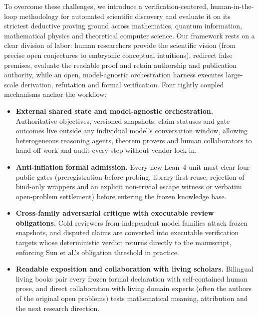 \documentclass[11pt,a4paper]{article}
\begin{document}
To overcome these challenges, we introduce a verification-centered,
human-in-the-loop methodology for automated scientific discovery and evaluate
it on its strictest deductive proving ground across mathematics, quantum
information, mathematical physics and theoretical computer science. Our
framework rests on a clear division of labor: human researchers provide the
scientific vision (from precise open conjectures to embryonic conceptual
intuitions), redirect false premises, evaluate the readable proof and retain
authorship and publication authority, while an open, model-agnostic
orchestration harness executes large-scale derivation, refutation and formal
verification. Four tightly coupled mechanisms anchor the workflow:
\begin{itemize}
\item \textbf{External shared state and model-agnostic orchestration.}
Authoritative objectives, versioned snapshots, claim statuses and gate outcomes
live outside any individual model's conversation window, allowing heterogeneous
reasoning agents, theorem provers and human collaborators to hand off work and
audit every step without vendor lock-in.
\item \textbf{Anti-inflation formal admission.} Every new Lean~4 unit must
clear four public gates (preregistration before probing, library-first reuse,
rejection of bind-only wrappers and an explicit non-trivial escape witness or
verbatim open-problem settlement) before entering the frozen knowledge base.
\item \textbf{Cross-family adversarial critique with executable review
obligations.} Cold reviewers from independent model families attack frozen
snapshots, and disputed claims are converted into executable verification
targets whose deterministic verdict returns directly to the manuscript,
enforcing Sun et al.'s obligation threshold in practice.
\item \textbf{Readable exposition and collaboration with living scholars.}
Bilingual living books pair every frozen formal declaration with self-contained
human prose, and direct collaboration with living domain experts (often the
authors of the original open problems) tests mathematical meaning, attribution
and the next research direction.
\end{itemize}
\end{document}

